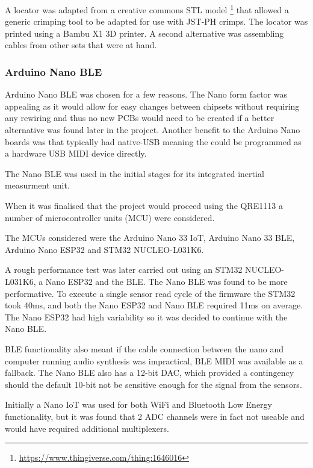 A locator was adapted from a creative commons STL model
\footnote{\url{https://www.thingiverse.com/thing:1646016}} that allowed a
generic crimping tool to be adapted for use with JST-PH crimps. 
The locator was printed using a Bambu X1 3D printer. 
A second alternative was assembling cables from other sets that were at hand.

\subsubsection{Arduino Nano BLE}\label{arduino-nano-ble}

Arduino Nano BLE was chosen for a few reasons. The Nano form factor was
appealing as it would allow for easy changes between chipsets without
requiring any rewiring and thus no new PCBs would need to be created if
a better alternative was found later in the project. Another benefit to
the Arduino Nano boards was that typically had native-USB meaning the
could be programmed as a hardware USB MIDI device directly.

The Nano BLE was used in the initial stages for its integrated inertial measurment unit.

When it was finalised that the project would proceed using the QRE1113 a
number of microcontroller units (MCU) were considered.

The MCUs considered were the Arduino Nano 33 IoT, Arduino Nano 33 BLE,
Arduino Nano ESP32 and STM32 NUCLEO-L031K6.

A rough performance test was later carried out using an STM32
NUCLEO-L031K6, a Nano ESP32 and the BLE. The Nano BLE was found to be
more performative. To execute a single sensor read cycle of the firmware
the STM32 took 40ms, and both the Nano ESP32 and Nano BLE required 11ms
on average. The Nano ESP32 had high variability so it was decided to
continue with the Nano BLE. 


BLE functionality also meant if the cable connection between the nano
and computer running audio synthesis was impractical, BLE MIDI was
available as a fallback. The Nano BLE also has a 12-bit DAC, which
provided a contingency should the default 10-bit not be sensitive enough
for the signal from the sensors.

Initially a Nano IoT was used for both WiFi and Bluetooth Low Energy
functionality, but it was found that 2 ADC channels were in fact not
useable and would have required additional multiplexers.


